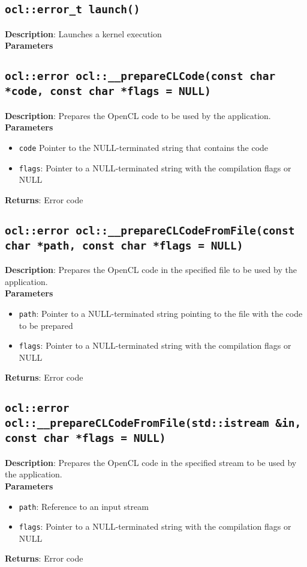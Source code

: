 \subsection{\texttt{ocl::error\_t launch()}}

\textbf{Description}: Launches a kernel execution\\
\textbf{Parameters}

\subsection{\texttt{ocl::error ocl::\_\_prepareCLCode(const char *code, const char *flags = NULL)}}

\textbf{Description}: Prepares the OpenCL code to be used by the application. \\
\textbf{Parameters}
\begin{itemize}
  \item \texttt{code} Pointer to the NULL-terminated string that contains the code
  \item \texttt{flags}: Pointer to a NULL\hyp{}terminated string with the compilation flags or NULL
\end{itemize}
\textbf{Returns}: Error code

\subsection{\texttt{ocl::error ocl::\_\_prepareCLCodeFromFile(const char *path, const char *flags = NULL)}}

\textbf{Description}: Prepares the OpenCL code in the specified file to be used by the application.  \\
\textbf{Parameters}
\begin{itemize}
  \item \texttt{path}: Pointer to a NULL\hyp{}terminated string pointing to the file with the code 
 to be prepared
  \item \texttt{flags}: Pointer to a NULL\hyp{}terminated string with the compilation flags or NULL
\end{itemize}
\textbf{Returns}: Error code

\subsection{\texttt{ocl::error ocl::\_\_prepareCLCodeFromFile(std::istream \&in, const char *flags = 
NULL)}}

\textbf{Description}: Prepares the OpenCL code in the specified stream to be used by the 
application.  \\
\textbf{Parameters}
\begin{itemize}
  \item \texttt{path}: Reference to an input stream
  \item \texttt{flags}: Pointer to a NULL\hyp{}terminated string with the compilation flags or NULL
\end{itemize}
\textbf{Returns}: Error code

